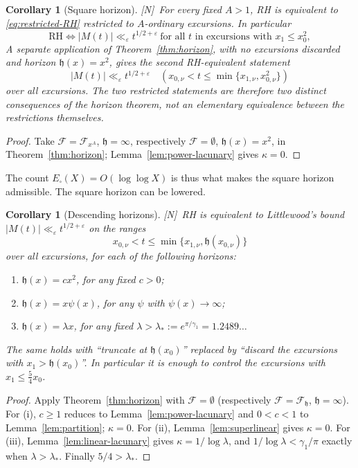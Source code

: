 \documentclass[11pt]{amsart}
\numberwithin{equation}{section}
\theoremstyle{plain}
\newtheorem{corollary}[theorem]{Corollary}
\theoremstyle{definition}
\theoremstyle{remark}
\newcommand{\eps}{\varepsilon}
\newcommand{\F}{\mathcal{F}}
\newcommand{\tagN}{\textup{[N]}}
\begin{document}
\begin{corollary}[Square horizon]
\label{cor:power-ordinary-RH}
\tagN\ For every fixed $A>1$, RH is equivalent to \eqref{eq:restricted-RH}
restricted to $A$-ordinary excursions. In particular
\begin{equation}
\label{eq:square-horizon-RH}
\boxed{\ \mathrm{RH}\iff
|M(t)|\ll_\eps t^{1/2+\eps}
\ \text{for all $t$ in excursions with }x_1\le x_0^2,\ }
\end{equation}
A separate application of Theorem~\ref{thm:horizon}, with no excursions
discarded and horizon $\mathfrak h(x)=x^2$, gives the second RH-equivalent
statement
\[
 |M(t)|\ll_\eps t^{1/2+\eps}
 \quad(x_{0,\nu}<t\le\min\{x_{1,\nu},x_{0,\nu}^2\})
\]
over all excursions.  The two restricted statements are therefore two
distinct consequences of the horizon theorem, not an elementary equivalence
between the restrictions themselves.
\end{corollary}

\begin{proof}
Take $\F=\F_{x^A}$, $\mathfrak h=\infty$, respectively $\F=\emptyset$, $\mathfrak h(x)=x^2$, in
Theorem~\ref{thm:horizon}; Lemma~\ref{lem:power-lacunary} gives
$\kappa=0$.
\end{proof}

The count $E_\square(X)=O(\log\log X)$ is thus what makes the square
horizon admissible. The square horizon can be lowered.

\begin{corollary}[Descending horizons]
\label{cor:descending}
\tagN\ RH is equivalent to Littlewood's bound
$|M(t)|\ll_\eps t^{1/2+\eps}$ on the ranges
\[
x_{0,\nu}<t\le\min\{x_{1,\nu},\mathfrak h(x_{0,\nu})\}
\]
over all excursions, for each of the following horizons:
\begin{enumerate}[label=\textup{(\roman*)}]
\item $\mathfrak h(x)=cx^2$, for any fixed $c>0$;
\item $\mathfrak h(x)=x\psi(x)$, for any $\psi$ with $\psi(x)\to\infty$;
\item $\mathfrak h(x)=\lambda x$, for any fixed $\lambda>\lambda_*:=e^{\pi/\gamma_1}=1.2489\ldots$
\end{enumerate}
The same holds with ``truncate at $\mathfrak h(x_0)$'' replaced by ``discard the
excursions with $x_1>\mathfrak h(x_0)$''. In particular it is enough to control the
excursions with $x_1\le\frac54x_0$.
\end{corollary}

\begin{proof}
Apply Theorem~\ref{thm:horizon} with $\F=\emptyset$ (respectively
$\F=\F_{\mathfrak h}$, $\mathfrak h=\infty$). For (i), $c\ge1$ reduces to
Lemma~\ref{lem:power-lacunary} and $0<c<1$ to Lemma~\ref{lem:partition};
$\kappa=0$. For (ii), Lemma~\ref{lem:superlinear} gives $\kappa=0$. For
(iii), Lemma~\ref{lem:linear-lacunary} gives $\kappa=1/\log\lambda$, and
$1/\log\lambda<\gamma_1/\pi$ exactly when $\lambda>\lambda_*$. Finally
$5/4>\lambda_*$.
\end{proof}
\end{document}
